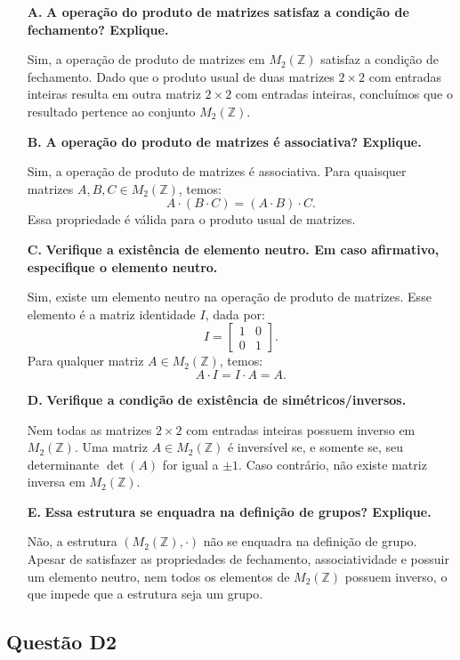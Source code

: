 \documentclass{article}
\begin{document}
\begin{enumerate}
    \item[\textbf{A.}] \textbf{A operação do produto de matrizes satisfaz a condição de fechamento? Explique.}

    Sim, a operação de produto de matrizes em $M_2(\mathbb{Z})$ satisfaz a condição de fechamento. Dado que o produto usual de duas matrizes $2 \times 2$ com entradas inteiras resulta em outra matriz $2 \times 2$ com entradas inteiras, concluímos que o resultado pertence ao conjunto $M_2(\mathbb{Z})$.

    \item[\textbf{B.}] \textbf{A operação do produto de matrizes é associativa? Explique.}

    Sim, a operação de produto de matrizes é associativa. Para quaisquer matrizes $A, B, C \in M_2(\mathbb{Z})$, temos:
    \[
    A \cdot (B \cdot C) = (A \cdot B) \cdot C.
    \]
    Essa propriedade é válida para o produto usual de matrizes.

    \item[\textbf{C.}] \textbf{Verifique a existência de elemento neutro. Em caso afirmativo, especifique o elemento neutro.}

    Sim, existe um elemento neutro na operação de produto de matrizes. Esse elemento é a matriz identidade $I$, dada por:
    \[
    I = \begin{bmatrix}
    1 & 0 \\
    0 & 1
    \end{bmatrix}.
    \]
    Para qualquer matriz $A \in M_2(\mathbb{Z})$, temos:
    \[
    A \cdot I = I \cdot A = A.
    \]

    \item[\textbf{D.}] \textbf{Verifique a condição de existência de simétricos/inversos.}

    Nem todas as matrizes $2 \times 2$ com entradas inteiras possuem inverso em $M_2(\mathbb{Z})$. Uma matriz $A \in M_2(\mathbb{Z})$ é inversível se, e somente se, seu determinante $\det(A)$ for igual a $\pm 1$. Caso contrário, não existe matriz inversa em $M_2(\mathbb{Z})$.

    \item[\textbf{E.}] \textbf{Essa estrutura se enquadra na definição de grupos? Explique.}

    Não, a estrutura $(M_2(\mathbb{Z}), \cdot)$ não se enquadra na definição de grupo. Apesar de satisfazer as propriedades de fechamento, associatividade e possuir um elemento neutro, nem todos os elementos de $M_2(\mathbb{Z})$ possuem inverso, o que impede que a estrutura seja um grupo.

\end{enumerate}
\subsection{Questão D2}
\end{document}
